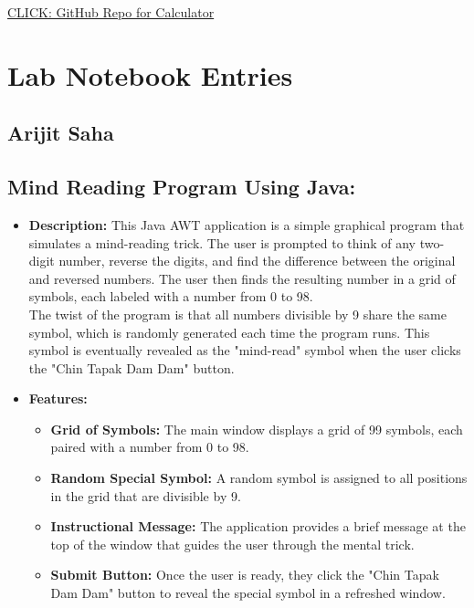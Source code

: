 \documentclass{article}
\begin{document}
\href{https://github.com/joyosmita/calculator}{CLICK: GitHub Repo for Calculator}


\newpage
\newpage
\section*{Lab Notebook Entries}
\subsection*{Arijit Saha}

\subsection*{Mind Reading Program Using Java:}

\begin{itemize}
    \item \textbf{Description:} This Java AWT application is a simple graphical program that simulates a mind-reading trick. The user is prompted to think of any two-digit number, reverse the digits, and find the difference between the original and reversed numbers. The user then finds the resulting number in a grid of symbols, each labeled with a number from 0 to 98.\\

    The twist of the program is that all numbers divisible by 9 share the same symbol, which is randomly generated each time the program runs. This symbol is eventually revealed as the "mind-read" symbol when the user clicks the "Chin Tapak Dam Dam" button.\\

    \item \textbf{Features:}
    \begin{itemize}
        \item \textbf{Grid of Symbols:} The main window displays a grid of 99 symbols, each paired with a number from 0 to 98.
        \item \textbf{Random Special Symbol:} A random symbol is assigned to all positions in the grid that are divisible by 9.
        \item \textbf{Instructional Message:} The application provides a brief message at the top of the window that guides the user through the mental trick.
        \item \textbf{Submit Button:} Once the user is ready, they click the "Chin Tapak Dam Dam" button to reveal the special symbol in a refreshed window.
    \end{itemize}
    

\end{itemize}
\end{document}

